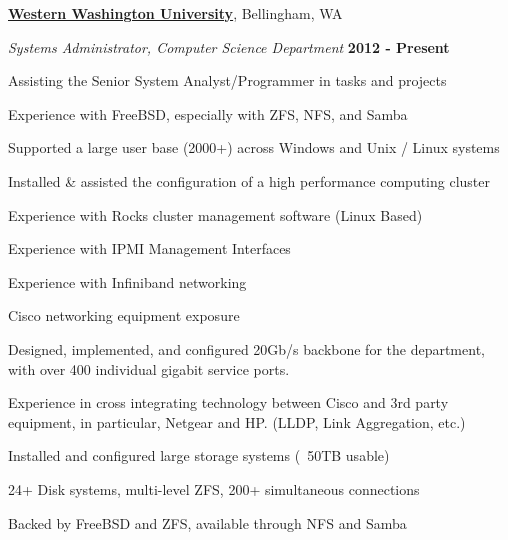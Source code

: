 \documentclass[10pt]{article}
\newcommand{\halfblankline}{\quad\vspace{-0.5\baselineskip}\pagebreak[3]}
\begin{document}
\href{http://www.wwu.edu/}{\textbf{Western Washington University}}, Bellingham, WA
\begin{outerlist}
  \item[] \textit{Systems Administrator, Computer Science Department}
  \hfill \textbf{2012 - Present}
  \begin{innerlist}
    \item Assisting the Senior System Analyst/Programmer in tasks and projects
    \item Experience with FreeBSD, especially with ZFS, NFS, and Samba
    \item Supported a large user base (2000+) across Windows and Unix / Linux systems
    \item Installed \& assisted the configuration of a high performance computing cluster
    \begin{innerlist}
      \item Experience with Rocks cluster management software (Linux Based)
      \item Experience with IPMI Management Interfaces
      \item Experience with Infiniband networking
    \end{innerlist}
    \item Cisco networking equipment exposure
    \begin{innerlist}
      \item Designed, implemented, and configured 20Gb/s backbone for the 
            department, \\with over 400 individual gigabit service ports.
      \item Experience in cross integrating technology between Cisco and 3rd party
            equipment, in particular, Netgear and HP. (LLDP, Link Aggregation, etc.)
    \end{innerlist}
    \item Installed and configured large storage systems (~50TB usable)
    \begin{innerlist}
      \item 24+ Disk systems, multi-level ZFS, 200+ simultaneous connections
      \item Backed by FreeBSD and ZFS, available through NFS and Samba
    \end{innerlist}
  \end{innerlist}
\end{outerlist}

\halfblankline
\end{document}
